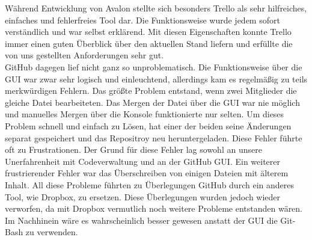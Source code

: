 Während Entwicklung von Avalon stellte sich besonders Trello als sehr hilfreiches, einfaches und fehlerfreies Tool dar. Die Funktionsweise wurde jedem sofort verständlich und war selbst erklärend. Mit diesen Eigenschaften konnte Trello immer einen guten Überblick über den aktuellen Stand liefern und erfüllte die von uns gestellten Anforderungen sehr gut.\\
GitHub dagegen lief nicht ganz so unproblematisch. Die Funktionsweise über die GUI war zwar sehr logisch und einleuchtend, allerdings kam es regelmäßig zu teils merkwürdigen Fehlern. Das größte Problem entstand, wenn zwei Mitglieder die gleiche Datei bearbeiteten. Das Mergen der Datei über die GUI war nie möglich und manuelles Mergen über die Konsole funktionierte nur selten. Um dieses Problem schnell und einfach zu Lösen, hat einer der beiden seine Änderungen separat gespeichert und das Repositroy neu heruntergeladen. Diese Fehler führte oft zu Frustrationen. Der Grund für diese Fehler lag sowohl an unsere Unerfahrenheit mit Codeverwaltung und an der GitHub GUI. Ein weiterer frustrierender Fehler war das Überschreiben von einigen Dateien mit älterem Inhalt. All diese Probleme führten zu Überlegungen GitHub durch ein anderes Tool, wie Dropbox, zu ersetzen. Diese Überlegungen wurden jedoch wieder verworfen, da mit Dropbox vermutlich noch weitere Probleme entstanden wären. Im Nachhinein wäre es wahrscheinlich besser gewesen anstatt der GUI die Git-Bash zu verwenden.




